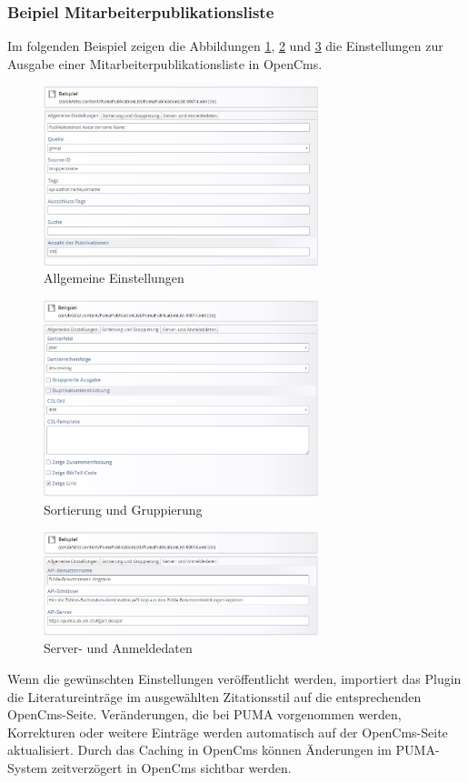 \subsubsection*{Beipiel Mitarbeiterpublikationsliste}\label{sss:mpl}
Im folgenden Beispiel zeigen die Abbildungen \ref{fig:mplAllgemeineEinstellungen}, \ref{fig:mplSortierungGruppierung} und \ref{fig:mplServerAnmeldedaten} die Einstellungen zur Ausgabe einer Mitarbeiterpublikationsliste in OpenCms.

\begin{figure}[h!]
 \centering
 \includegraphics[width=8cm]{Bilder/Kapitel9/Mitarbeiterliste1.jpeg}
 \caption{Allgemeine Einstellungen}
 \label{fig:mplAllgemeineEinstellungen}
\end{figure}
\begin{figure}[h!]
 \centering
 \includegraphics[width=8cm]{Bilder/Kapitel9/Mitarbeiterliste2.jpeg}
 \caption{Sortierung und Gruppierung}
 \label{fig:mplSortierungGruppierung}
\end{figure}
\begin{figure}[h!]
 \centering
 \includegraphics[width=8cm]{Bilder/Kapitel9/Mitarbeiterliste3.jpeg}
 \caption{Server- und Anmeldedaten}
 \label{fig:mplServerAnmeldedaten}
\end{figure}
Wenn die gewünschten Einstellungen veröffentlicht werden, importiert das Plugin die Literatureinträge im ausgewählten Zitationsstil auf die entsprechenden OpenCms-Seite. Veränderungen, die bei PUMA vorgenommen werden, Korrekturen oder weitere Einträge werden automatisch auf der OpenCms-Seite aktualisiert. Durch das Caching in OpenCms können Änderungen im PUMA-System zeitverzögert in OpenCms sichtbar werden.
